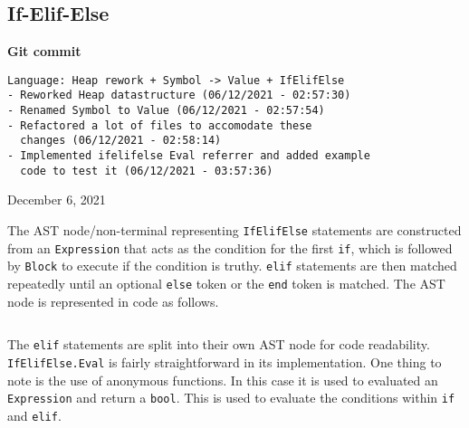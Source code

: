 \subsection{If-Elif-Else}

\begin{center}
    \textbf{Git commit}
    \begin{verbatim}
Language: Heap rework + Symbol -> Value + IfElifElse
- Reworked Heap datastructure (06/12/2021 - 02:57:30)
- Renamed Symbol to Value (06/12/2021 - 02:57:54)
- Refactored a lot of files to accomodate these 
  changes (06/12/2021 - 02:58:14)
- Implemented ifelifelse Eval referrer and added example
  code to test it (06/12/2021 - 03:57:36)
    \end{verbatim}
    \vspace{-1em}
    \tiny{December 6, 2021}
\end{center}

The AST node/non-terminal representing \verb|IfElifElse| statements are constructed from an \verb|Expression| that acts as the condition for the first \verb|if|, which is followed by \verb|Block| to execute if the condition is truthy. \verb|elif| statements are then matched repeatedly until an optional \verb|else| token or the \verb|end| token is matched. The AST node is represented in code as follows.

\inputminted[firstline=304, lastline=320, autogobble, breaklines, tabsize=4]{go}{../../src/parser/ast.go}

The \verb|elif| statements are split into their own AST node for code readability. \verb|IfElifElse.Eval| is fairly straightforward in its implementation. One thing to note is the use of anonymous functions. In this case it is used to evaluated an \verb|Expression| and return a \texttt{bool}. This is used to evaluate the conditions within \verb|if| and \verb|elif|.

\inputminted[firstline=801, lastline=815, autogobble, breaklines, tabsize=4]{go}{../../src/parser/eval.go}
